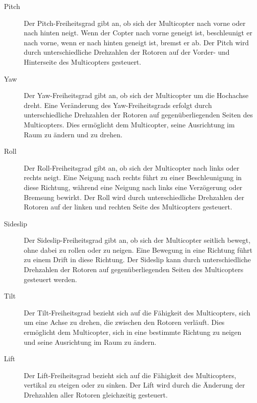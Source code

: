 \begin{description}
    \item[Pitch] Der Pitch-Freiheitsgrad gibt an, ob sich der Multicopter nach vorne oder nach hinten neigt. Wenn der Copter nach vorne geneigt ist, beschleunigt er nach vorne, wenn er nach hinten geneigt ist, bremst er ab. Der Pitch wird durch unterschiedliche Drehzahlen der Rotoren auf der Vorder- und Hinterseite des Multicopters gesteuert.
    \item[Yaw] Der Yaw-Freiheitsgrad gibt an, ob sich der Multicopter um die Hochachse dreht. Eine Veränderung des Yaw-Freiheitsgrads erfolgt durch unterschiedliche Drehzahlen der Rotoren auf gegenüberliegenden Seiten des Multicopters. Dies ermöglicht dem Multicopter, seine Ausrichtung im Raum zu ändern und zu drehen.
    \item[Roll] Der Roll-Freiheitsgrad gibt an, ob sich der Multicopter nach links oder rechts neigt. Eine Neigung nach rechts führt zu einer Beschleunigung in diese Richtung, während eine Neigung nach links eine Verzögerung oder Bremsung bewirkt. Der Roll wird durch unterschiedliche Drehzahlen der Rotoren auf der linken und rechten Seite des Multicopters gesteuert.
    \item[Sideslip] Der Sideslip-Freiheitsgrad gibt an, ob sich der Multicopter seitlich bewegt, ohne dabei zu rollen oder zu neigen. Eine Bewegung in eine Richtung führt zu einem Drift in diese Richtung. Der Sideslip kann durch unterschiedliche Drehzahlen der Rotoren auf gegenüberliegenden Seiten des Multicopters gesteuert werden.
    \item[Tilt] Der Tilt-Freiheitsgrad bezieht sich auf die Fähigkeit des Multicopters, sich um eine Achse zu drehen, die zwischen den Rotoren verläuft. Dies ermöglicht dem Multicopter, sich in eine bestimmte Richtung zu neigen und seine Ausrichtung im Raum zu ändern.
    \item[Lift] Der Lift-Freiheitsgrad bezieht sich auf die Fähigkeit des Multicopters, vertikal zu steigen oder zu sinken. Der Lift wird durch die Änderung der Drehzahlen aller Rotoren gleichzeitig gesteuert.    
\end{description}

